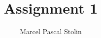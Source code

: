 \documentclass[12pt]{article}
\title{Assignment 1}
\author{\textup{Marcel Pascal Stolin}}
\begin{document}
	
	\newpage
	
    
    \newpage
    


    \newpage
    \appendix
    
\end{document}
